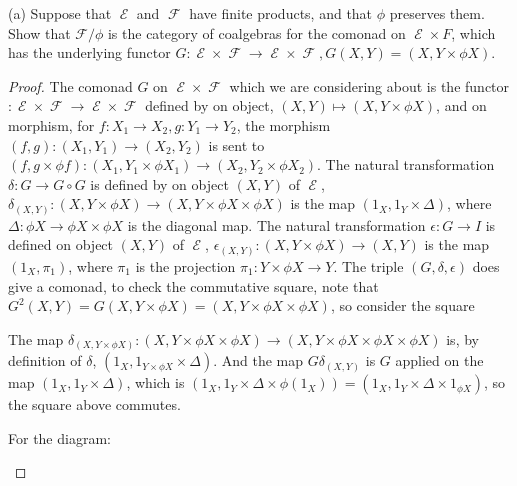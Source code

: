 \documentclass[a4paper]{article}
\DeclareMathOperator{\E}{\mathcal E}
\DeclareMathOperator{\F}{\mathcal F}
\begin{document}
(a) Suppose that $\E$ and $\F$ have finite products, and that $\phi$ preserves them. Show that $\mathcal F/\phi$ is the category of coalgebras for the comonad on $\E\times F$, which has the underlying functor $G:\E\times \F\to \E\times \F, G(X,Y)=(X,Y\times \phi X)$.
\begin{proof}
    The comonad $G$ on $\E\times \F$ which we are considering about is the functor $:\E\times \F\to \E\times \F$ defined by on object, $(X,Y)\mapsto (X,Y\times \phi X)$, and on morphism, for $f:X_1\to X_2,g:Y_1\to Y_2$, the morphism $(f,g):(X_1,Y_1)\to (X_2,Y_2)$ is sent to $(f,g\times \phi f):(X_1,Y_1\times \phi X_1)\to (X_2,Y_2\times \phi X_2)$. The natural transformation $\delta:G\to G\circ G$ is defined by on object $(X,Y)$ of $\E$, $\delta_{(X,Y)}:(X,Y\times \phi X)\to (X,Y\times \phi X\times \phi X)$ is the map $(1_X,1_Y\times \Delta)$, where $\Delta:\phi X\to \phi X\times \phi X$ is the diagonal map. The natural transformation $\epsilon :G\to I$ is defined on object $(X,Y)$ of $\E$, $\epsilon_{(X,Y)}:(X,Y\times \phi X)\to (X,Y)$ is the map $(1_X,\pi_1)$, where $\pi_1$ is the projection $\pi_1:Y\times \phi X\to Y$. The triple $(G,\delta,\epsilon)$ does give a comonad, to check the commutative square, note that $G^2(X,Y)=G(X,Y\times \phi X) = (X,Y\times \phi X\times \phi X)$, so consider the square
    \begin{center}
    \end{center}

    The map $\delta_{(X,Y\times \phi X)}:(X,Y\times \phi X\times \phi X)\to (X,Y\times \phi X\times \phi X\times \phi X)$ is, by definition of $\delta$, $(1_X,1_{Y\times \phi X}\times \Delta)$. And the map $G\delta_{(X,Y)}$ is $G$ applied on the map $(1_X,1_Y\times\Delta)$, which is $(1_X,1_Y\times\Delta\times \phi(1_X))= (1_X,1_Y\times\Delta\times 1_{\phi X})$, so the square above commutes.

    For the diagram:

    \begin{center}
    \end{center}


\end{proof}
\end{document}
